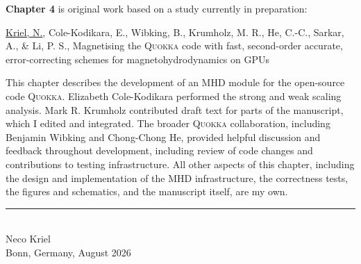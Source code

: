 \clearpage
\textbf{Chapter 4} is original work based on a study currently in preparation:
\begin{description}
    \item \underline{{Kriel, N.}}, Cole-Kodikara, E., Wibking, B., Krumholz, M. R., He, C.-C., Sarkar, A., \& Li, P. S., Magnetising the \textsc{Quokka} code with fast, second-order accurate, error-correcting schemes for magnetohydrodynamics on GPUs
\end{description}
This chapter describes the development of an MHD module for the open-source code \textsc{Quokka}. Elizabeth Cole-Kodikara performed the strong and weak scaling analysis. Mark R. Krumholz contributed draft text for parts of the manuscript, which I edited and integrated. The broader \textsc{Quokka} collaboration, including Benjamin Wibking and Chong-Chong He, provided helpful discussion and feedback throughout development, including review of code changes and contributions to testing infrastructure. All other aspects of this chapter, including the design and implementation of the MHD infrastructure, the correctness tests, the figures and schematics, and the manuscript itself, are my own.

\vspace{2 cm}
\begin{flushright}
  \noindent\rule{5.0cm}{0.4 pt}\\
  Neco Kriel\\
  Bonn, Germany, August 2026
\end{flushright}